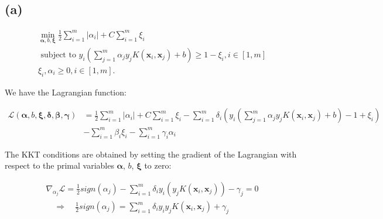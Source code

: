 \documentclass{article}
\begin{document}
\subsection*{(a)}
\begin{equation}
    \begin{aligned}
        \min _{\boldsymbol{\alpha}, b, \boldsymbol{\xi}} \frac{1}{2} \sum_{i=1}^{m}\left|\alpha_{i}\right|+C \sum_{i=1}^{m} \xi_{i}                               \\
        \text { subject to } y_{i}\left(\sum_{j=1}^{m} \alpha_{j} y_{j} K\left(\boldsymbol{x}_{i}, \boldsymbol{x}_{j}\right)+b\right) \geq 1-\xi_{i}, i \in[1, m] \\
        \xi_{i}, \alpha_{i} \geq 0, i \in[1, m] .
    \end{aligned}
\end{equation}

We have the Lagrangian function:

\begin{align}
    \mathcal{L}(\bm{\alpha}, b, \bm{\xi}, \bm{\delta}, \bm{\beta}, \bm{\gamma})
     & =\frac{1}{2} \sum_{i=1}^{m}\left|\alpha_{i}\right|
    + C \sum_{i=1}^{m} {\xi}_{i}
    - \sum_{i=1}^{m}
    \delta_{i}
    \left(
    y_{i}\left(\sum_{j=1}^{m} \alpha_{j} y_{j} K\left(\boldsymbol{x}_{i}, \boldsymbol{x}_{j}\right)+b\right) - 1 + \xi_{i}
    \right)                                               \\
     & - \sum_{i=1}^{m} \beta_{i} \xi_{i}
    - \sum_{i=1}^{m} \gamma_{i} \alpha_{i}
\end{align}


The KKT conditions are obtained by setting the gradient of the Lagrangian with respect to the primal variables $\bm{\alpha}$, $b$, $\bm{\xi}$ to zero:

\begin{equation}
    \begin{aligned}
        \nabla_{\alpha_{j}} \mathcal{L} =
        \frac{1}{2} sign(\alpha_{j})
        -
        \sum_{i=1}^{m}
        \delta_{i}
        y_{i}
        \left(
        y_{j} K\left(\boldsymbol{x}_{i}, \boldsymbol{x}_{j}\right)
        \right)
        - \gamma_{j}
        = 0 \\
        \quad \Longrightarrow \quad
        \frac{1}{2} sign(\alpha_{j}) =
        \sum_{i=1}^{m}
        \delta_{i}
        y_{i}
        y_{j} K\left(\boldsymbol{x}_{i}, \boldsymbol{x}_{j}\right)
        + \gamma_{j}
    \end{aligned}
    \label{eq:KKT}
\end{equation}\
\end{document}
